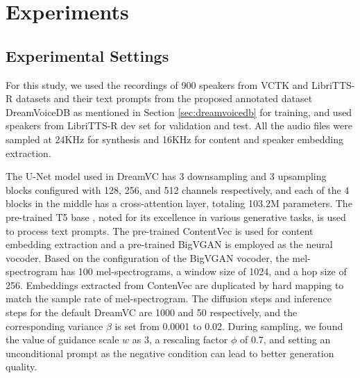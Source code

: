 \documentclass{Interspeech2024}
\begin{document}



\section{Experiments}



\subsection{Experimental Settings}
For this study, we used the recordings of 900 speakers from VCTK \cite{Yamagishi2019VCTK} and LibriTTS-R \cite{koizumi2023libritts} datasets and their text prompts from the proposed annotated dataset DreamVoiceDB as mentioned in Section \ref{sec:dreamvoicedb} for training, and used speakers from LibriTTS-R dev set for validation and test.
All the audio files were sampled at 24KHz for synthesis and 16KHz for content and speaker embedding extraction.

The U-Net model \cite{ronneberger2015u} used in DreamVC has 3 downsampling and 3 upsampling blocks configured with 128, 256, and 512 channels respectively, and each of the 4 blocks in the middle has a cross-attention layer, totaling 103.2M parameters. The pre-trained T5 base \cite{raffel2020T5}, noted for its excellence in various generative tasks, is used to process text prompts. The pre-trained ContentVec \cite{qian2022contentvec} is used for content embedding extraction and a pre-trained BigVGAN \cite{lee2022bigvgan} is employed as the neural vocoder. Based on the configuration of the BigVGAN vocoder, the mel-spectrogram has 100 mel-spectrograms, a window size of 1024, and a hop size of 256.
Embeddings extracted from ContenVec are duplicated by hard mapping to match the sample rate of mel-spectrogram. 
The diffusion steps and inference steps for the default DreamVC are 1000 and 50 respectively, and the corresponding variance $\beta$ is set from 0.0001 to 0.02. During sampling, we found the value of guidance scale $w$ as 3, a rescaling factor $\phi$ of 0.7, and setting an unconditional prompt as the negative condition can lead to better generation quality.
\end{document}
